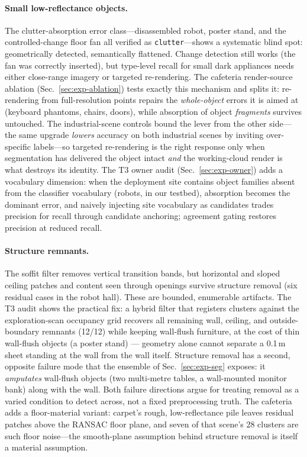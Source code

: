 \paragraph{Small low-reflectance objects.}
The clutter-absorption error class---disassembled robot, poster stand, and
the controlled-change floor fan all verified as
\texttt{clutter}---shows a systematic blind spot: geometrically detected,
semantically flattened. Change detection still works (the fan was
correctly inserted), but type-level recall for small dark appliances needs
either close-range imagery or targeted re-rendering. The cafeteria
render-source ablation (Sec.~\ref{sec:exp-ablation}) tests exactly this
mechanism and splits it: re-rendering from full-resolution points repairs
the \emph{whole-object} errors it is aimed at (keyboard phantoms, chairs,
doors), while absorption of object \emph{fragments} survives untouched.
The industrial-scene controls bound the lever from the other side---the
same upgrade \emph{lowers} accuracy on both industrial scenes by
inviting over-specific labels---so targeted re-rendering is the right
response only when segmentation has delivered the object intact
\emph{and} the working-cloud render is what destroys its identity. The T3 owner audit
(Sec.~\ref{sec:exp-owner}) adds a vocabulary dimension: when the
deployment site contains object families absent from the classifier
vocabulary (robots, in our testbed), absorption becomes the dominant
error, and naively injecting site vocabulary as candidates trades
precision for recall through candidate anchoring; agreement gating
restores precision at reduced recall.

\paragraph{Structure remnants.}
The soffit filter removes vertical transition bands, but horizontal and
sloped ceiling patches and content seen through openings survive structure
removal (six residual cases in the robot hall). These are bounded,
enumerable artifacts. The T3 audit shows the practical fix: a hybrid
filter that registers clusters against the exploration-scan occupancy
grid recovers all remaining wall, ceiling, and outside-boundary remnants
(12/12) while keeping wall-flush furniture, at the cost of thin
wall-flush objects (a poster stand) --- geometry alone cannot separate a
0.1\,m sheet standing at the wall from the wall itself. Structure
removal has a second, opposite failure mode that the ensemble of
Sec.~\ref{sec:exp-seg} exposes: it \emph{amputates} wall-flush objects
(two multi-metre tables, a wall-mounted monitor bank) along with the
wall. Both failure directions argue for treating removal as a varied
condition to detect across, not a fixed preprocessing truth. The
cafeteria adds a floor-material variant: carpet's rough, low-reflectance
pile leaves residual patches above the RANSAC floor plane, and seven of
that scene's 28 clusters are such floor noise---the smooth-plane
assumption behind structure removal is itself a material assumption.

